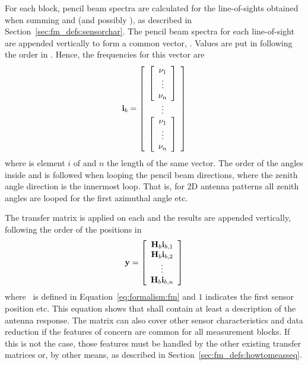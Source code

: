 For each block, pencil beam spectra are calculated for the
line-of-sights obtained when summing  and
 (and possibly
), as described in
Section~\ref{sec:fm_defs:sensorchar}. The pencil beam spectra for each
line-of-sight are appended vertically to form a common vector,
. Values are put in following the order in
. Hence, the frequencies for this vector are
\begin{equation}
  \mathbf{i}_{b} = 
  \left[ \begin{array}{c} 
     \left[
          \begin{array}{c} \nu_{1}\\\vdots\\\nu_{n} \end{array} 
     \right] \\
     \vdots \\
     \left[
          \begin{array}{c} \nu_{1}\\\vdots\\\nu_{n} \end{array} 
     \right]
     \end{array} \right]
  \label{eq:fm_defs:freqs_of_ib}
\end{equation}
where  is element $i$ of  and $n$ the length of
the same vector. The order of the angles inside 
and  is followed when looping the pencil beam
directions, where the zenith angle direction is the innermost loop.
That is, for 2D antenna patterns all zenith angles are looped for the
first azimuthal angle etc. 

The transfer matrix  is applied on each  and the
results are appended vertically, following the order of the positions
in 
\begin{equation}
  \mathbf{y} = \left[ \begin{array}{c} \mathbf{H}_{b}\mathbf{i}_{{b,1}} \\ 
                                    \mathbf{H}_{b}\mathbf{i}_{{b,2}} \\
                                    \vdots                     \\
                                    \mathbf{H}_{b}\mathbf{i}_{{b,n}} 
            \end{array} \right]
  \label{eq:fm_defs:measseq}
\end{equation}
where \MsrVct\ is defined in Equation~\ref{eq:formalism:fm} and $1$
indicates the first sensor position etc. This equation shows that
 shall contain at least a description of the antenna
response. The matrix  can also cover other sensor
characteristics and data reduction if the features of concern are
common for all measurement blocks. If this is not the case, those
features must be handled by the other existing transfer matrices or, by
other means, as described in Section~\ref{sec:fm_defs:howtomeasseq}.

